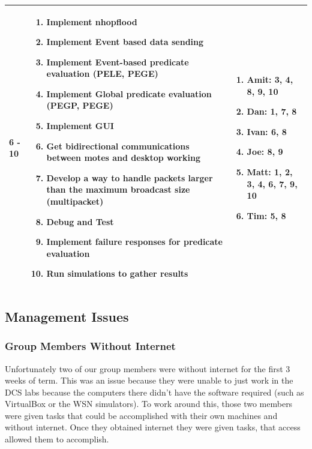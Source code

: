 \begin{center}
\begin{longtable}{| l | p{7.5cm} | p{5cm} |}
	6 - 10 & \begin{enumerate}
		\item Implement nhopflood
		\item Implement Event based data sending
		\item Implement Event-based predicate evaluation (PELE, PEGE)
		\item Implement Global predicate evaluation (PEGP, PEGE)
		\item Implement GUI
		\item Get bidirectional communications between motes and desktop working
		\item Develop a way to handle packets larger than the maximum broadcast size (multipacket)
		\item Debug and Test
		\item Implement failure responses for predicate evaluation
		\item Run simulations to gather results
		\end{enumerate} &
	\begin{enumerate}
		\item[] Amit: 3, 4, 8, 9, 10
		\item[] Dan: 1, 7, 8
		\item[] Ivan: 6, 8
		\item[] Joe: 8, 9
		\item[] Matt: 1, 2, 3, 4, 6, 7, 9, 10
		\item[] Tim: 5, 8
	\end{enumerate}
	\\ \hline
	
	\end{longtable}
\end{center}


\subsection{Management Issues}

\subsubsection{Group Members Without Internet}
Unfortunately two of our group members were without internet for the first 3 weeks of term. This was an issue because they were unable to just work in the DCS labs because the computers there didn't have the software required (such as VirtualBox or the WSN simulators). To work around this, those two members were given tasks that could be accomplished with their own machines and without internet. Once they obtained internet they were given tasks, that access allowed them to accomplish.

